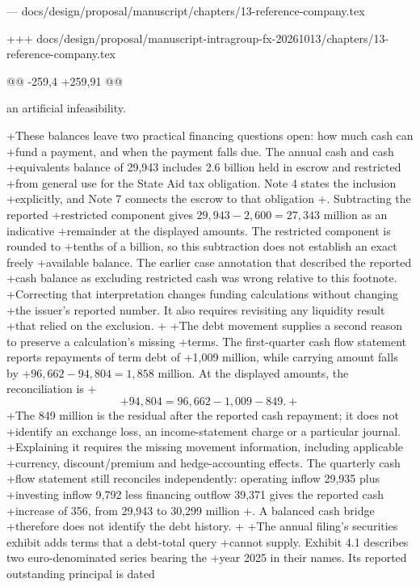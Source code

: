 --- docs/design/proposal/manuscript/chapters/13-reference-company.tex

+++ docs/design/proposal/manuscript-intragroup-fx-20261013/chapters/13-reference-company.tex

@@ -259,4 +259,91 @@

 an artificial infeasibility.
 
+These balances leave two practical financing questions open: how much cash can
+fund a payment, and when the payment falls due. The annual cash and cash
+equivalents balance of 29,943 includes 2.6 billion held in escrow and restricted
+from general use for the State Aid tax obligation. Note 4 states the inclusion
+explicitly, and Note 7 connects the escrow to that obligation
+\citep[Notes 4 and 7, printed pp.~37 and 39]{apple2024}. Subtracting the reported
+restricted component gives $29{,}943-2{,}600=27{,}343$ million as an indicative
+remainder at the displayed amounts. The restricted component is rounded to
+tenths of a billion, so this subtraction does not establish an exact freely
+available balance. The earlier case annotation that described the reported
+cash balance as excluding restricted cash was wrong relative to this footnote.
+Correcting that interpretation changes funding calculations without changing
+the issuer's reported number. It also requires revisiting any liquidity result
+that relied on the exclusion.
+
+The debt movement supplies a second reason to preserve a calculation's missing
+terms. The first-quarter cash flow statement reports repayments of term debt of
+1,009 million, while carrying amount falls by
+$96{,}662-94{,}804=1{,}858$ million. At the displayed amounts, the reconciliation is
+\[
+       94{,}804=96{,}662-1{,}009-849.
+\]
+The 849 million is the residual after the reported cash repayment; it does not
+identify an exchange loss, an income-statement charge or a particular journal.
+Explaining it requires the missing movement information, including applicable
+currency, discount/premium and hedge-accounting effects. The quarterly cash
+flow statement still reconciles independently: operating inflow 29,935 plus
+investing inflow 9,792 less financing outflow 39,371 gives the reported cash
+increase of 356, from 29,943 to 30,299 million
+\citep[statement of cash flows and Note 6]{apple2025q1}. A balanced cash bridge
+therefore does not identify the debt history.
+
+The annual filing's securities exhibit adds terms that a debt-total query
+cannot supply. Exhibit 4.1 describes two euro-denominated series bearing the
+year 2025 in their names. Its reported outstanding principal is dated
